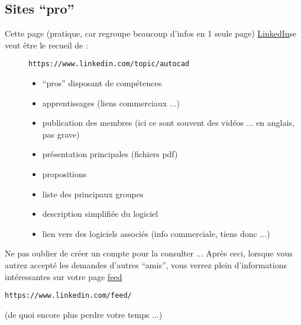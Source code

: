 \documentclass[a4paper,10pt,french]{sphinxmanual}
\begin{document}
\subsection{Sites ``pro''}
\label{\detokenize{docs/refs/autocad-help:sites-pro}}\begin{description}
\item[{Cette page (pratique, car regroupe beaucoup d'infos en 1 seule page) \href{https://www.linkedin.com/topic/autocad}{LinkedIn}\sphinxfootnotemark[1] se veut être le recueil de :}] \leavevmode%
\begin{footnotetext}[1]\sphinxAtStartFootnote
\nolinkurl{https://www.linkedin.com/topic/autocad}
%
\end{footnotetext}\begin{itemize}
\item {} 
``pros'' disposant de compétences 

\item {} 
apprentissages (liens commerciaux ...)

\item {} 
publication des membres (ici ce sont souvent des vidéos ... en anglais, pas grave)

\item {} 
présentation principales (fichiers pdf)

\item {} 
propositions 

\item {} 
liste des principaux groupes

\item {} 
description simplifiée du logiciel

\item {} 
lien vers des logiciels associés (info commerciale, tiens donc ...)

\end{itemize}

\end{description}

Ne pas oublier de créer un compte pour la consulter ...
Après ceci, lorsque vous autrez accepté les demandes d'autres ``amis'', vous verrez plein d'informations intéressantes sur votre page \href{https://www.linkedin.com/feed/}{feed}%
\begin{footnote}[2]\sphinxAtStartFootnote
\nolinkurl{https://www.linkedin.com/feed/}
%
\end{footnote} (de quoi encore plus perdre votre temps ...)
\end{document}
